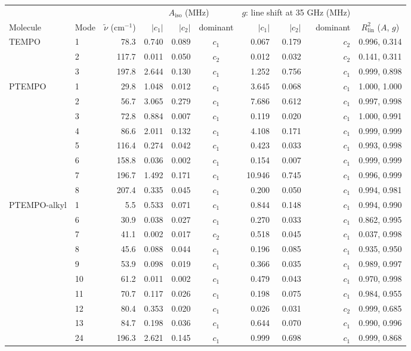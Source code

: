 \begin{tabular}{llrrrcrrrc}
\toprule
 & & & \multicolumn{3}{c}{$A_\mathrm{iso}$ (MHz)} & \multicolumn{3}{c}{$g$: line shift at 35 GHz (MHz)} & \\
\cmidrule(lr){4-6}\cmidrule(lr){7-9}
Molecule & Mode & $\tilde\nu$ (cm$^{-1}$) & $|c_1|$ & $|c_2|$ & dominant & $|c_1|$ & $|c_2|$ & dominant & $R^2_\mathrm{lin}$ ($A$, $g$)\\
\midrule
TEMPO & 1 & 78.3 & 0.740 & 0.089 & $c_1$ & 0.067 & 0.179 & $c_2$ & 0.996, 0.314\\
 & 2 & 117.7 & 0.011 & 0.050 & $c_2$ & 0.012 & 0.032 & $c_2$ & 0.141, 0.311\\
 & 3 & 197.8 & 2.644 & 0.130 & $c_1$ & 1.252 & 0.756 & $c_1$ & 0.999, 0.898\\
\midrule
PTEMPO & 1 & 29.8 & 1.048 & 0.012 & $c_1$ & 3.645 & 0.068 & $c_1$ & 1.000, 1.000\\
 & 2 & 56.7 & 3.065 & 0.279 & $c_1$ & 7.686 & 0.612 & $c_1$ & 0.997, 0.998\\
 & 3 & 72.8 & 0.884 & 0.007 & $c_1$ & 0.119 & 0.020 & $c_1$ & 1.000, 0.991\\
 & 4 & 86.6 & 2.011 & 0.132 & $c_1$ & 4.108 & 0.171 & $c_1$ & 0.999, 0.999\\
 & 5 & 116.4 & 0.274 & 0.042 & $c_1$ & 0.423 & 0.033 & $c_1$ & 0.993, 0.998\\
 & 6 & 158.8 & 0.036 & 0.002 & $c_1$ & 0.154 & 0.007 & $c_1$ & 0.999, 0.999\\
 & 7 & 196.7 & 1.492 & 0.171 & $c_1$ & 10.946 & 0.745 & $c_1$ & 0.996, 0.999\\
 & 8 & 207.4 & 0.335 & 0.045 & $c_1$ & 0.200 & 0.050 & $c_1$ & 0.994, 0.981\\
\midrule
PTEMPO-alkyl & 1 & 5.5 & 0.533 & 0.071 & $c_1$ & 0.844 & 0.148 & $c_1$ & 0.994, 0.990\\
 & 6 & 30.9 & 0.038 & 0.027 & $c_1$ & 0.270 & 0.033 & $c_1$ & 0.862, 0.995\\
 & 7 & 41.1 & 0.002 & 0.017 & $c_2$ & 0.518 & 0.045 & $c_1$ & 0.037, 0.998\\
 & 8 & 45.6 & 0.088 & 0.044 & $c_1$ & 0.196 & 0.085 & $c_1$ & 0.935, 0.950\\
 & 9 & 53.9 & 0.098 & 0.019 & $c_1$ & 0.366 & 0.035 & $c_1$ & 0.989, 0.997\\
 & 10 & 61.2 & 0.011 & 0.002 & $c_1$ & 0.479 & 0.043 & $c_1$ & 0.970, 0.998\\
 & 11 & 70.7 & 0.117 & 0.026 & $c_1$ & 0.198 & 0.075 & $c_1$ & 0.984, 0.955\\
 & 12 & 80.4 & 0.353 & 0.020 & $c_1$ & 0.026 & 0.031 & $c_2$ & 0.999, 0.685\\
 & 13 & 84.7 & 0.198 & 0.036 & $c_1$ & 0.644 & 0.070 & $c_1$ & 0.990, 0.996\\
 & 24 & 196.3 & 2.621 & 0.145 & $c_1$ & 0.999 & 0.698 & $c_1$ & 0.999, 0.868\\
\bottomrule
\end{tabular}
